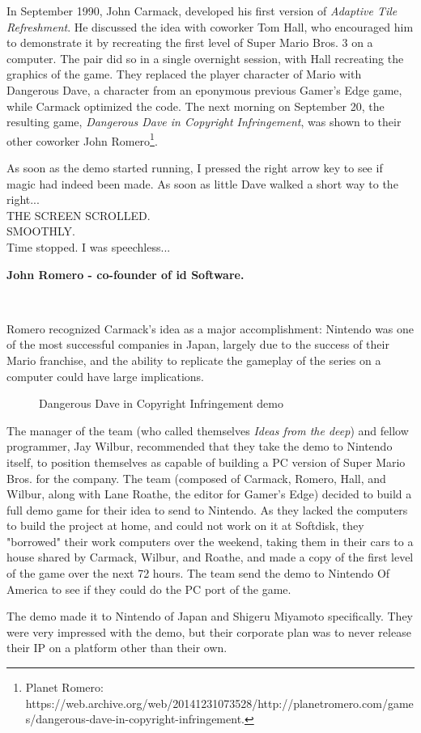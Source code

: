 \documentclass[book.tex]{subfiles}
\begin{document}
In September 1990, John Carmack, developed his first version of \textit{Adaptive Tile Refreshment}. He discussed the idea with coworker Tom Hall, who encouraged him to demonstrate it by recreating the first level of Super Mario Bros. 3 on a computer. The pair did so in a single overnight session, with Hall recreating the graphics of the game. They replaced the player character of Mario with Dangerous Dave, a character from an eponymous previous Gamer's Edge game, while Carmack optimized the code. The next morning on September 20, the resulting game, \textit{Dangerous Dave in Copyright Infringement}, was shown to their other coworker John Romero\footnote{Planet Romero: https://web.archive.org/web/20141231073528/http://planetromero.com/games/dangerous-dave-in-copyright-infringement.}. \\

\par
\begin{fancyquotes}
As soon as the demo started running, I pressed the right arrow key to see if magic had indeed been made. As soon as little Dave walked a short way to the right...\\

THE SCREEN SCROLLED.\\

SMOOTHLY.\\

Time stopped. I was speechless...\\
\par
\textbf{John Romero - co-founder of id Software.}
\end{fancyquotes}\\


\par
Romero recognized Carmack's idea as a major accomplishment: Nintendo was one of the most successful companies in Japan, largely due to the success of their Mario franchise, and the ability to replicate the gameplay of the series on a computer could have large implications.\\

\begin{figure}[H]
\centering
 \caption{Dangerous Dave in Copyright Infringement demo}
 \label{fig:ddici}
\end{figure}

\par
The manager of the team (who called themselves \textit{Ideas from the deep}) and fellow programmer, Jay Wilbur, recommended that they take the demo to Nintendo itself, to position themselves as capable of building a PC version of Super Mario Bros. for the company. The team (composed of Carmack, Romero, Hall, and Wilbur, along with Lane Roathe, the editor for Gamer's Edge) decided to build a full demo game for their idea to send to Nintendo. As they lacked the computers to build the project at home, and could not work on it at Softdisk, they "borrowed" their work computers over the weekend, taking them in their cars to a house shared by Carmack, Wilbur, and Roathe, and made a copy of the first level of the game over the next 72 hours. The team send the demo to Nintendo Of America to see if they could do the PC port of the game. \\

\par
The demo made it to Nintendo of Japan and Shigeru Miyamoto specifically. They were very impressed with the demo, but their corporate plan was to never release their IP on a platform other than their own.
\end{document}
